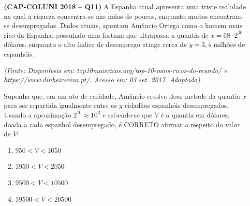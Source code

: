 \textbf{(CAP-COLUNI 2018 -- Q11)} A Espanha atual apresenta uma triste realidade na qual a riqueza concentra-se nas mãos de poucos, enquanto muitos encontram-se desempregados. Dados atuais, apontam Amâncio Ortega como o homem mais rico da Espanha, possuindo uma fortuna que ultrapassa a quantia de $x=68\cdot 2^{30}$ dólares, enquanto o alto índice de desemprego atinge cerca de $y=3{,}4$ milhões de espanhóis.

\par\smallskip\textit{(Fonte: Disponíveis em: top10maisricos.org/top-10-mais-ricos-do-mundo/ e https://www.dinheirovivo.pt/. Acesso em: 03 set. 2017. Adaptado).}

Suponha que, em um ato de caridade, Amâncio resolva doar metade da quantia $x$ para ser repartida igualmente entre os $y$ cidadãos espanhóis desempregados. Usando a aproximação $2^{10}\approx10^3$ e sabendo-se que $V$ é a quantia em dólares, doada a cada espanhol desempregado, é CORRETO afirmar a respeito do valor de $V$:

\begin{enumerate}
	\item $950<V<1050$
	\item $1950<V<2050$
	\item $9500<V<10500$
	\item $19500<V<20500$
\end{enumerate}
